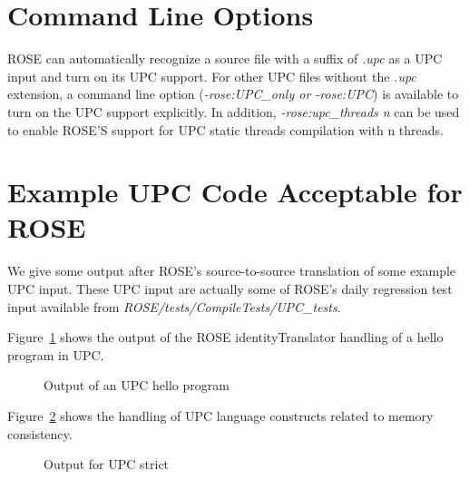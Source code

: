 \section{Command Line Options}
ROSE can automatically recognize a source file with a suffix of \textit{.upc} as a UPC input and turn on its UPC support.
For other UPC files without the \textit{.upc} extension, a command line
option (\textit{-rose:UPC\_only or -rose:UPC}) is available to turn on the
UPC support explicitly.
In addition, \textit{-rose:upc\_threads n} can be used to enable ROSE'S
support for UPC static threads compilation with n threads.

\section{Example UPC Code Acceptable for ROSE}
We give some output after ROSE's source-to-source translation of some example UPC input. 
These UPC input are actually some of ROSE's daily regression test input available from \textit{ROSE/tests/CompileTests/UPC\_tests}.

Figure~\ref{Manual:UPC:hello} shows the output of the ROSE
identityTranslator handling of a hello program in UPC.
\begin{figure}[!h]
{\indent
  {\mySmallFontSize
    \begin{latexonly}
    
    \end{latexonly}
    \begin{htmlonly}
    
    \end{htmlonly}
  }
}
\caption{Output of an UPC hello program}
\label{Manual:UPC:hello}
\end{figure}

Figure~\ref{Manual:UPC:strict} shows the handling of UPC language
constructs related to memory consistency. 
\begin{figure}[!h]
{\indent
  {\mySmallFontSize
    \begin{latexonly}
    
    \end{latexonly}
    \begin{htmlonly}
    
    \end{htmlonly}
  }
}
\caption{Output for UPC strict}
\label{Manual:UPC:strict}
\end{figure}


